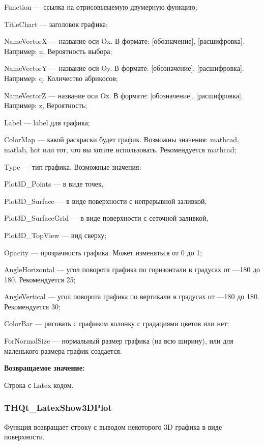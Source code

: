 \documentclass[a4paper,12pt]{article}
\begin{document}
    Function --- ссылка на отрисовываемую двумерную функцию;
 
    TitleChart --- заголовок графика;
 
    NameVectorX --- название оси Ox. В формате: [обозначение], [расшифровка]. Например: u, Вероятность выбора;
 
    NameVectorY --- название оси Oy. В формате: [обозначение], [расшифровка]. Например: q, Количество абрикосов;
 
    NameVectorZ --- название оси Oz. В формате: [обозначение], [расшифровка]. Например: z, Вероятность;
 
    Label --- label для графика;
 
    ColorMap --- какой раскраски будет график. Возможны значения: mathcad, matlab, hot или тот, что вы хотите использовать. Рекомендуется mathcad;
 
    Type --- тип графика. Возможные значения:
 
       Plot3D\_Points --- в виде точек,
 
       Plot3D\_Surface --- в виде поверхности с непрерывной заливкой,
 
       Plot3D\_SurfaceGrid --- в виде поверхности с сеточной заливкой,
 
       Plot3D\_TopView --- вид сверху;
 
    Opacity --- прозрачность графика. Может изменяться от 0 до 1;
 
    AngleHorizontal --- угол поворота графика по горизонтали в градусах от ---180 до 180. Рекомендуется 25;
 
    AngleVertical --- угол поворота графика по вертикали в градусах от ---180 до 180. Рекомендуется 30;
 
    ColorBar --- рисовать с графиком колонку с градациями цветов или нет;
 
    ForNormalSize --- нормальный размер графика (на всю ширину), или для маленького размера график создается.

\textbf{Возвращаемое значение:}

Строка с Latex кодом.


\subsubsection{THQt\_LatexShow3DPlot}\label{THQt_LatexShow3DPlot}

Функция возвращает строку с выводом некоторого 3D графика в виде поверхности.
\end{document}
